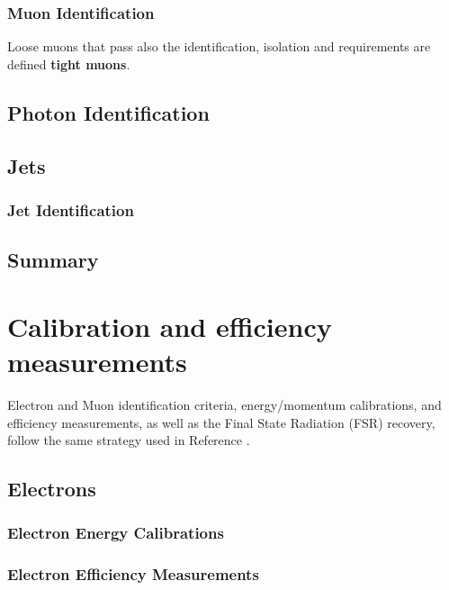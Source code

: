 \subsubsection{Muon Identification}


Loose muons that pass also the identification, isolation and \SIPthreeD requirements are defined \textbf{tight muons}.

\subsection{Photon Identification}
\label{sec:photonID}


\subsection{Jets}
\subsubsection{Jet Identification}


\subsection{Summary}


\section{Calibration and efficiency measurements}
Electron and Muon identification criteria, energy/momentum calibrations, and efficiency measurements,
as well as the Final State Radiation (FSR) recovery, follow the same strategy used in Reference \cite{CMS-SMP-20-001}. %

\subsection{Electrons}
\subsubsection{Electron Energy Calibrations}

\subsubsection{Electron Efficiency Measurements}
\label{sec:eleEffMeas}


